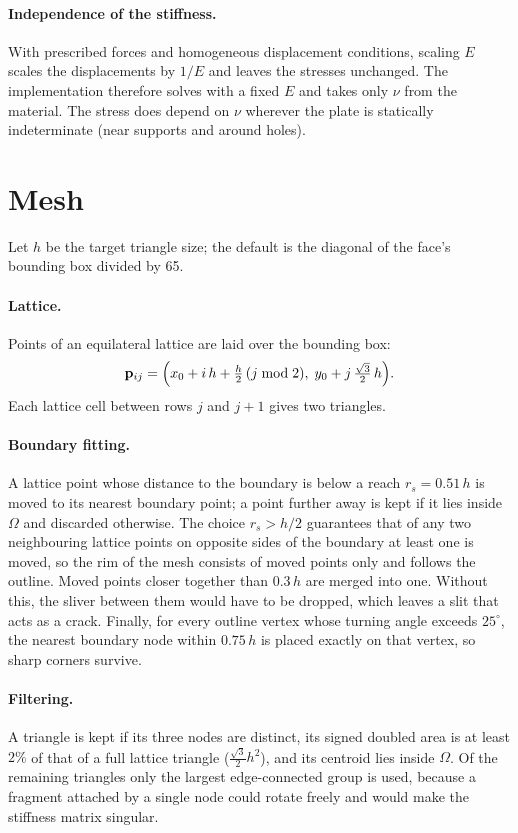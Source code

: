 \documentclass[11pt,a4paper]{article}
\newcommand{\vect}[1]{\mathbf{#1}}
\begin{document}
\paragraph{Independence of the stiffness.} With prescribed forces and
homogeneous displacement conditions, scaling $E$ scales the displacements by
$1/E$ and leaves the stresses unchanged. The implementation therefore
solves with a fixed $E$ and takes only $\nu$ from the material. The stress
does depend on $\nu$ wherever the plate is statically indeterminate (near
supports and around holes).

\section{Mesh}

Let $h$ be the target triangle size; the default is the diagonal of the
face's bounding box divided by 65.

\paragraph{Lattice.} Points of an equilateral lattice are laid over the
bounding box:
\begin{equation}
  \vect{p}_{ij} = \Bigl( x_0 + i\,h + \tfrac{h}{2}\,(j \bmod 2),\;
                        y_0 + j\,\tfrac{\sqrt{3}}{2}\,h \Bigr).
\end{equation}
Each lattice cell between rows $j$ and $j+1$ gives two triangles.

\paragraph{Boundary fitting.} A lattice point whose distance to the boundary
is below a reach $r_s = 0.51\,h$ is moved to its nearest boundary point; a
point further away is kept if it lies inside $\Omega$ and discarded
otherwise. The choice $r_s > h/2$ guarantees that of any two neighbouring
lattice points on opposite sides of the boundary at least one is moved, so
the rim of the mesh consists of moved points only and follows the outline.
Moved points closer together than $0.3\,h$ are merged into one. Without
this, the sliver between them would have to be dropped, which leaves a slit
that acts as a crack. Finally, for every outline vertex whose turning angle
exceeds $25^\circ$, the nearest boundary node within $0.75\,h$ is placed
exactly on that vertex, so sharp corners survive.

\paragraph{Filtering.} A triangle is kept if its three nodes are distinct,
its signed doubled area is at least $2\%$ of that of a full lattice triangle
($\tfrac{\sqrt 3}{2}h^2$), and its centroid lies inside $\Omega$. Of the
remaining triangles only the largest edge-connected group is used, because a
fragment attached by a single node could rotate freely and would make the
stiffness matrix singular.
\end{document}
